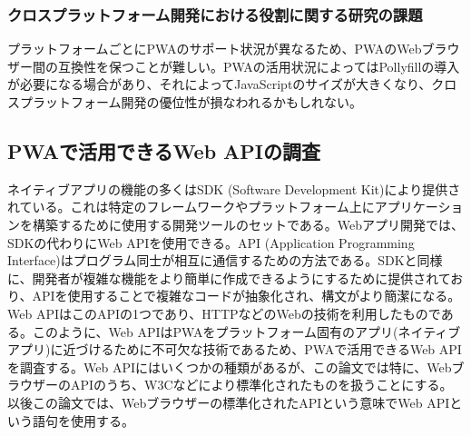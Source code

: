 \subsubsection{クロスプラットフォーム開発における役割に関する研究の課題}
\label{subsubsection:クロスプラットフォーム開発における役割に関する研究の課題}
プラットフォームごとにPWAのサポート状況が異なるため、PWAのWebブラウザー間の互換性を保つことが難しい。PWAの活用状況によってはPollyfillの導入が必要になる場合があり、それによってJavaScriptのサイズが大きくなり、クロスプラットフォーム開発の優位性が損なわれるかもしれない。
\subsection{PWAで活用できるWeb APIの調査}\label{subsection:PWAで活用できるWeb APIの調査}
ネイティブアプリの機能の多くはSDK (Software Development Kit)により提供されている。これは特定のフレームワークやプラットフォーム上にアプリケーションを構築するために使用する開発ツールのセットである。Webアプリ開発では、SDKの代わりにWeb APIを使用できる。API (Application Programming Interface)はプログラム同士が相互に通信するための方法である。SDKと同様に、開発者が複雑な機能をより簡単に作成できるようにするために提供されており、APIを使用することで複雑なコードが抽象化され、構文がより簡潔になる。Web APIはこのAPIの1つであり、HTTPなどのWebの技術を利用したものである。このように、Web APIはPWAをプラットフォーム固有のアプリ(ネイティブアプリ)に近づけるために不可欠な技術であるため、PWAで活用できるWeb APIを調査する。Web APIにはいくつかの種類があるが、この論文では特に、WebブラウザーのAPIのうち、W3Cなどにより標準化されたものを扱うことにする。以後この論文では、Webブラウザーの標準化されたAPIという意味でWeb APIという語句を使用する。
